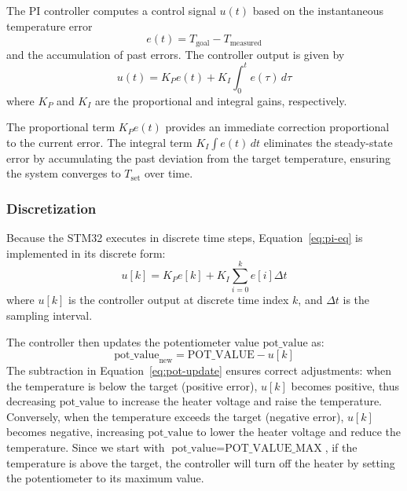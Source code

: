 \documentclass[12pt,a4paper]{article}
\begin{document}
The PI controller computes a control signal $u(t)$ based on the instantaneous temperature error
\begin{equation}
    e(t) = T_{\text{goal}} - T_{\text{measured}}
    \label{eq:pi-error}
\end{equation}
and the accumulation of past errors. The controller output is given by
\begin{equation}
    u(t) = K_P e(t) + K_I \int_0^t e(\tau)\, d\tau
    \label{eq:pi-eq}
\end{equation}
where $K_P$ and $K_I$ are the proportional and integral gains, respectively.

The proportional term $K_P e(t)$ provides an immediate correction proportional to the current error. The integral term $K_I \int e(t)\,dt$ eliminates the steady-state error by accumulating the past deviation from the target temperature, ensuring the system converges to $T_{\text{set}}$ over time.

\subsubsection{Discretization}

Because the STM32 executes in discrete time steps, Equation~\eqref{eq:pi-eq} is implemented in its discrete form:
\begin{equation}
    u[k] = K_P e[k] + K_I \sum_{i=0}^{k} e[i] \Delta t
    \label{eq:pi-discrete}
\end{equation}
where $u[k]$ is the controller output at discrete time index $k$, and $\Delta t$ is the sampling interval.

The controller then updates the potentiometer value $\text{pot\_value}$ as:
\begin{equation}
    \text{pot\_value}_{\text{new}} = \text{POT\_VALUE} - u[k]
    \label{eq:pot-update}
\end{equation}
The subtraction in Equation~\eqref{eq:pot-update} ensures correct adjustments: when the temperature is below the target (positive error), $u[k]$ becomes positive, thus decreasing $\text{pot\_value}$ to increase the heater voltage and raise the temperature. Conversely, when the temperature exceeds the target (negative error), $u[k]$ becomes negative, increasing $\text{pot\_value}$ to lower the heater voltage and reduce the temperature. Since we start with $\text{pot\_value}=\text{POT\_VALUE\_MAX}$, if the temperature is above the target, the controller will turn off the heater by setting the potentiometer to its maximum value.
\end{document}
